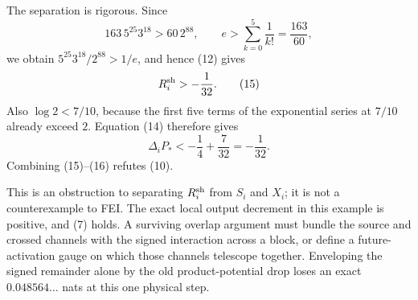 The separation is rigorous.  Since
\[
 163\,5^{25}3^{18}>60\,2^{88},\qquad
 e>\sum_{k=0}^5\frac1{k!}=\frac{163}{60},
\]
we obtain $5^{25}3^{18}/2^{88}>1/e$, and hence (12) gives
\[
 R_i^{\rm sh}>-\frac1{32}.                                   \tag{15}
\]
Also $\log2<7/10$, because the first five terms of the exponential series
at $7/10$ already exceed $2$.  Equation (14) therefore gives
\[
 \Delta_iP_*<-\frac14+\frac7{32}=-\frac1{32}.                 \tag{16}
\]
Combining (15)--(16) refutes (10).

This is an obstruction to separating $R_i^{\rm sh}$ from $S_i$ and $X_i$;
it is not a counterexample to FEI.  The exact local output decrement in this
example is positive, and (7) holds.  A surviving overlap argument must bundle
the source and crossed channels with the signed interaction across a block,
or define a future-activation gauge on which those channels telescope
together.  Enveloping the signed remainder alone by the old product-potential
drop loses an exact $0.048564\ldots$ nats at this one physical step.
